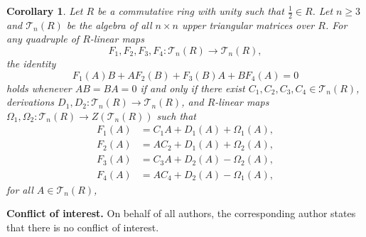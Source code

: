 \documentclass[reqno]{amsart}
\numberwithin{equation}{section}
\theoremstyle{plain}
\newtheorem{corollary}[theorem]{Corollary}
\theoremstyle{definition}
\begin{document}
\begin{corollary}\label{cor:upper-triangular-standard-form}
Let $R$ be a commutative ring with unity such that
$\frac{1}{2}\in R$. Let $n\geq3$ and $\mathcal T_n(R)$ be the
algebra of all $n\times n$ upper triangular matrices over $R$.
For any quadruple of $R$-linear maps
\[
F_1,F_2,F_3,F_4:\mathcal T_n(R)\longrightarrow\mathcal T_n(R),
\]
the identity
\[
F_1(A)B+AF_2(B)+F_3(B)A+BF_4(A)=0
\]
holds whenever $AB=BA=0$ if and only if there exist
$C_1,C_2,C_3,C_4\in\mathcal T_n(R)$, derivations
$D_1,D_2:\mathcal T_n(R)\to\mathcal T_n(R)$, and $R$-linear maps
$\Omega_1,\Omega_2: \mathcal T_n(R)\longrightarrow Z(\mathcal T_n(R))$
such that
\[
\begin{aligned}
F_1(A)&=C_1A+D_1(A)+\Omega_1(A),\\
F_2(A)&=AC_2+D_1(A)+\Omega_2(A),\\
F_3(A)&=C_3A+D_2(A)-\Omega_2(A),\\
F_4(A)&=AC_4+D_2(A)-\Omega_1(A),
\end{aligned}
\]
for all $A\in\mathcal T_n(R)$,
\end{corollary}

\smallskip
\noindent\textbf{Conflict of interest.}
On behalf of all authors, the corresponding author states that
there is no conflict of interest.
\end{document}
